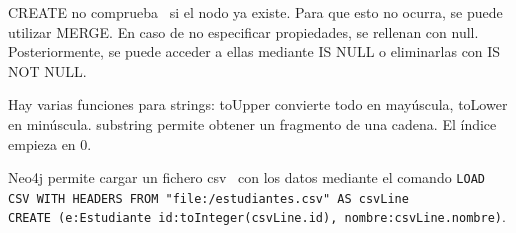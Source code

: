 CREATE no comprueba   \ si el nodo ya existe. Para que esto no ocurra, se puede utilizar MERGE. En caso de no especificar propiedades, se rellenan con null. Posteriormente, se puede acceder a ellas mediante IS NULL o eliminarlas con IS NOT NULL.

Hay varias funciones para strings: toUpper convierte todo en mayúscula, toLower en minúscula. substring permite obtener un fragmento de una cadena. El índice empieza en 0.

Neo4j permite cargar un fichero csv   \ con los datos mediante el comando \texttt{LOAD CSV WITH HEADERS FROM "file:/estudiantes.csv" AS csvLine \\ CREATE (e:Estudiante {id:toInteger(csvLine.id), nombre:csvLine.nombre})}.